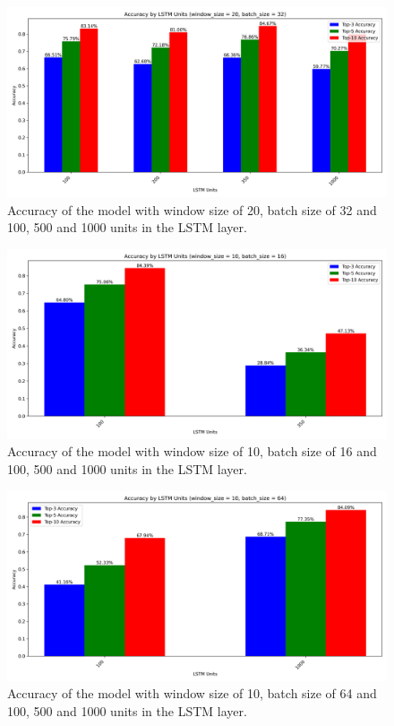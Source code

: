 \begin{figure}[h!]
    \centering
    \includegraphics[scale=0.4]{images/accuracy_by_lstm_units_window_20_batch_32.png}
    \caption{Accuracy of the model with window size of 20, batch size of 32 and 100, 500 and 1000 units in the LSTM layer.}
    \label{fig:window_size20}
\end{figure}

\begin{figure}[h!]
    \centering
    \includegraphics[scale=0.4]{images/accuracy_by_lstm_units_window_10_batch_16.png}
    \caption{Accuracy of the model with window size of 10, batch size of 16 and 100, 500 and 1000 units in the LSTM layer.}
    \label{fig:window_size10_batch16}
\end{figure}

\begin{figure}[h!]
    \centering
    \includegraphics[scale=0.4]{images/accuracy_by_lstm_units_window_10_batch_64.png}
    \caption{Accuracy of the model with window size of 10, batch size of 64 and 100, 500 and 1000 units in the LSTM layer.}
    \label{fig:window_size10_batch64}
\end{figure}

